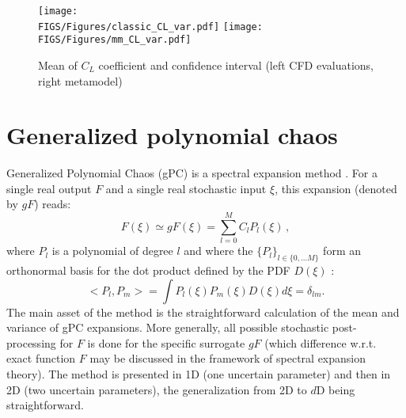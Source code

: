 \documentclass{eurosae}
\def\beq{\begin{equation}}
\def\eeq{\end{equation}}
\newcommand{\lift}{C_L}
\begin{document}
%
%
\begin{figure}[!h]
\begin{center}
\texttt{[image: \\FIGS/Figures/classic\_CL\_var.pdf]} \hspace{10mm}
\texttt{[image: \\FIGS/Figures/mm\_CL\_var.pdf]}
\end{center}
\caption{Mean of $\lift$ coefficient and confidence interval (left CFD evaluations, right metamodel)}
\label{f:naca-me-v}
\end{figure}
%
%
%
\newpage
\section{Generalized polynomial chaos}\label{sec:gPC}
%
Generalized Polynomial Chaos (gPC) is a spectral expansion method \cite{Wie_38,GhaSpa_91,XiuKar_02}.
For a single real output $F$ and a single real stochastic input $\xi$, this expansion (denoted by $gF$) reads:
%
\beq
 F(\xi)\simeq gF(\xi) = \sum_{l=0}^{M} C_l P_l(\xi)\,,  
\label{e:gpc-exp} 
\eeq
%
 where $P_l$ is a polynomial of degree $l$ and where the $\{P_l\}_{l\in\{0,...M\}}$ form an orthonormal basis 
 for the dot product defined by the PDF $D(\xi)$ :
\beq
  <P_l,P_m> = \int P_l(\xi) P_m(\xi) D(\xi) d\xi = \delta_{lm}.
\label{e:gpc-ortho} 
\eeq
%
The main asset of the method is the straightforward calculation of the  mean and variance of gPC expansions.
 More generally, all possible stochastic post-processing for $F$ is done for the specific surrogate $gF$
 (which difference w.r.t. exact function $F$ may be discussed in the framework of spectral expansion theory). The method is presented in 1D (one uncertain parameter) and then in 2D (two uncertain parameters), the generalization from 2D to $d$D being straightforward.  
%
\end{document}
